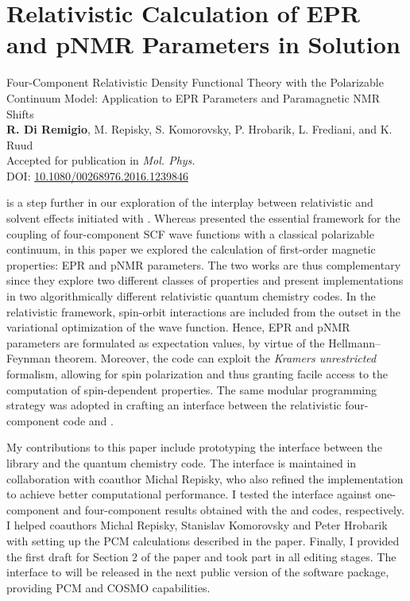 \section{Relativistic Calculation of EPR and pNMR Parameters in
Solution}\label{sec:pcmepr}

\begin{tcolorbox}
  {\small
  \textsf{Four-Component Relativistic Density Functional Theory with the
  Polarizable Continuum Model: Application to EPR Parameters
  and Paramagnetic NMR Shifts
  }
  \\
  \textbf{R. Di Remigio}, M. Repisky, S. Komorovsky, P. Hrobarik, L.
  Frediani, and K. Ruud
  \\
  Accepted for publication in \textit{Mol. Phys.}
  \\
  DOI: \url{10.1080/00268976.2016.1239846}
  }
\end{tcolorbox}

 is a step further in our exploration of the interplay between
relativistic and solvent effects initiated with .
Whereas  presented the essential framework for the coupling of
four-component \acrshort{SCF} wave functions with a classical polarizable continuum,
in this paper we explored the calculation of first-order magnetic properties:
\gls{EPR} and \gls{pNMR} parameters.\autocite{Repisky2010-ls, Malkin2011-nm,
Komorovsky2013-xa, Cherry2016-ij}
The two works are thus complementary since they explore two different classes
of properties and present implementations in two algorithmically different
relativistic quantum chemistry codes.
In the relativistic framework, spin-orbit interactions are included from the
outset in the variational optimization of the wave function.
Hence, \acrshort{EPR} and \acrshort{pNMR} parameters are formulated as expectation
values, by virtue of the Hellmann--Feynman theorem.\autocite{Konishi2009-zb,
Helgaker2000-tz}
Moreover, the \ReSpect code can exploit the \emph{Kramers unrestricted} formalism,
allowing for spin polarization and thus granting facile access to the computation
of spin-dependent properties.\autocite{Dyall2007-tu}
The same modular programming strategy was adopted in crafting an interface between the
relativistic four-component code \ReSpect\autocite{ReSpect-3.5.0} and \pcmsolver.

My contributions to this paper include prototyping the interface between the
\pcmsolver library and the \ReSpect quantum chemistry code.
The interface is maintained in collaboration with coauthor Michal Repisky, who also
refined the implementation to achieve better computational performance.
I tested the interface against one-component and four-component results obtained with
the \LSDALTON and \DIRAC codes, respectively.
I helped coauthors Michal Repisky, Stanislav Komorovsky and Peter Hrobarik
with setting up the \acrshort{PCM} calculations described in the paper.
Finally, I provided the first draft for Section 2 of the paper and took part in all editing stages.
The interface to \ReSpect will be released in the next public version of the software
package, providing \acrshort{PCM} and \acrshort{COSMO} capabilities.

